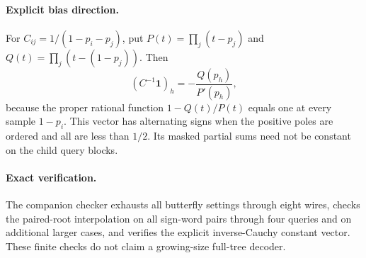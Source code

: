 \documentclass[11pt]{article}
\begin{document}
\paragraph{Explicit bias direction.}
For $C_{ij}=1/(1-p_i-p_j)$, put
$P(t)=\prod_j(t-p_j)$ and $Q(t)=\prod_j(t-(1-p_j))$.
Then
\[
 (C^{-1}\mathbf1)_h=-\frac{Q(p_h)}{P'(p_h)},
\]
because the proper rational function $1-Q(t)/P(t)$ equals one at
every sample $1-p_i$. This vector has alternating signs when the
positive poles are ordered and all are less than $1/2$. Its masked
partial sums need not be constant on the child query blocks.

\paragraph{Exact verification.}
The companion checker exhausts all butterfly settings through eight
wires, checks the paired-root interpolation on all sign-word pairs
through four queries and on additional larger cases, and verifies the
explicit inverse-Cauchy constant vector. These finite checks do not
claim a growing-size full-tree decoder.
\end{document}
